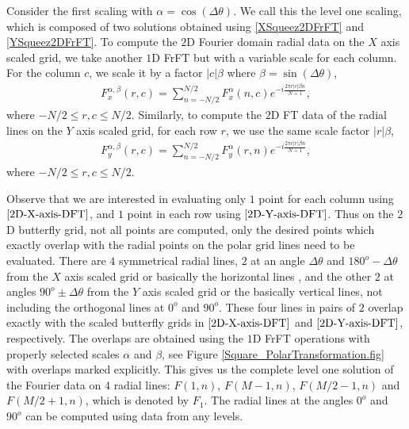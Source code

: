 \documentclass{UCF_ETD}
\begin{document}
 Consider the first scaling with $\alpha = \cos(\Delta \theta)$. We call this the level one scaling, which is composed of two solutions obtained using \eqref{XSqueez2DFrFT} and \eqref{YSqueez2DFrFT}. To compute the $2$D Fourier domain radial data on the $X$ axis scaled grid, we take another $1$D FrFT but with a variable scale for each column. For the column $c$, we scale it by a factor $|c|\beta$ where $\beta = \sin(\Delta \theta)$,
 \begin{eqnarray} \label{2D-X-axis-DFT}
 F^{\alpha, \beta }_x(r,c) = \sum\limits_{n=-N/2}^{N/2}F^{\alpha}_x (n,c) e^{-i\frac{2\pi r |c| \beta n}{N+1}},
 \end{eqnarray}
 where $ -N/2 \leq r, c \leq N/2$.
 Similarly, to compute the $2$D FT data of the radial lines on the $Y$ axis scaled grid, for each row $r$, we use the same scale factor $|r|\beta$,
 \begin{eqnarray} \label{2D-Y-axis-DFT}
 F^{ \alpha, \beta }_y(r,c) = \sum\limits_{n=-N/2}^{N/2}F^{\alpha}_y (r,n) e^{-i\frac{2\pi c |r|\beta n}{N+1}},
 \end{eqnarray}
 where $ -N/2 \leq r, c \leq N/2$.
 
 Observe that we are interested in evaluating only $1$ point for each column using $\eqref{2D-X-axis-DFT}$, and $1$ point in each row using $\eqref{2D-Y-axis-DFT}$. Thus on the $2$D butterfly grid, not all points are computed, only the desired points which exactly overlap with the radial points on the polar grid lines need to be evaluated. There are $4$ symmetrical radial lines, $2$ at an angle $\Delta \theta$ and $180^o - \Delta \theta$ from the $X$ axis scaled grid or basically the horizontal lines \cite{Amir2001}, and the other $2$ at angles $90^o \pm \Delta \theta $ from the $Y$ axis scaled grid or the {basically vertical lines}, not including the orthogonal lines at $0^o$ and $90^o$. These four lines in pairs of $2$ overlap exactly with the scaled butterfly grids in $\eqref{2D-X-axis-DFT}$ and $\eqref{2D-Y-axis-DFT}$, respectively.
  The overlaps are obtained using the $1$D FrFT operations with properly selected scales $\alpha$ and $\beta$, see Figure \ref{Square_PolarTransformation.fig} with overlaps marked explicitly. This gives us the complete level one solution of the Fourier data on $4$ radial lines:  $F(1,n)$, $F({M-1},n)$, $F({M/2-1},n)$ and $F({M/2+1},n)$,  which is denoted by $F_1$. The radial lines at the angles $0^o$ and $90^o$ can be computed using data from any levels.
 
\end{document}
